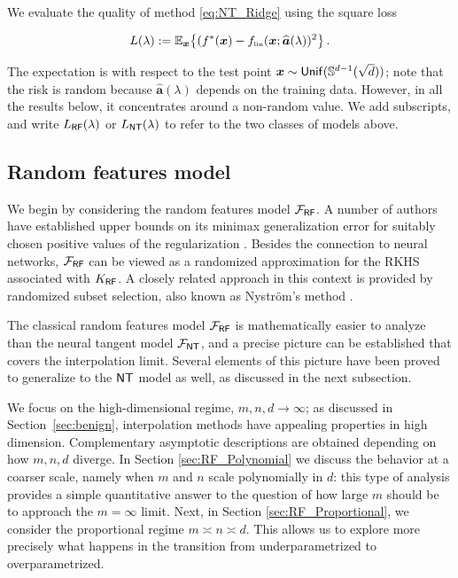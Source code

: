 We evaluate the quality of method \eqref{eq:NT_Ridge} using the square loss

\begin{align}
  {L}(\lambda):= \mathbb{E}_{{\boldsymbol x}}\big\{(f^*({\boldsymbol x})-f_{\mbox{\rm\tiny lin}}({\boldsymbol x};{\widehat {\boldsymbol a}}(\lambda))^2\big\}\, .
\end{align}

The expectation is with respect to the test point ${\boldsymbol x}\sim {\sf Unif}({\mathbb S}^{d-1}(\sqrt{d}))$;
note that the risk is random because ${\widehat {\boldsymbol a}}(\lambda)$ depends on the training data. However, in all the results below, it concentrates around a non-random value. We add subscripts, and write ${L}_{{\sf RF}}(\lambda)$ or ${L}_{{\sf NT}}(\lambda)$ to refer to the two classes of models above.

\subsection{Random features model}
\label{sec:RF}

We begin by considering the random features model ${\mathcal F}_{{\sf RF}}$. A number of authors have established upper bounds on its minimax generalization error for suitably chosen positive values of the regularization \cite{rudi2017generalization,rahimi2009weighted}. Besides the connection to neural networks,  ${\mathcal F}_{{\sf RF}}$  can be viewed as a randomized approximation  for the RKHS associated with $K_{{\sf RF}}$. A closely related approach in this context is provided by randomized subset selection, also known as Nystr\"om's method \cite{williams2001using,bach2013sharp,alaoui2015fast,rudi2015less}.

The classical random features model ${\mathcal F}_{{\sf RF}}$ is mathematically easier to analyze than the neural tangent model
 ${\mathcal F}_{{\sf NT}}$,   and a precise picture can be established that covers the interpolation limit. Several elements of this picture have been proved to generalize to the ${\sf NT}$ model as well, as discussed in the next subsection.

We focus on the high-dimensional regime, $m,n,d\to\infty$; as discussed in Section~\ref{sec:benign}, interpolation methods have appealing properties in high dimension. Complementary asymptotic descriptions are obtained depending on how $m,n,d$ diverge. In Section \ref{sec:RF_Polynomial} we discuss the behavior at a coarser scale, namely when $m$ and $n$ scale polynomially in $d$: this type of analysis provides a simple quantitative answer to the question of how large $m$ should be to approach the $m=\infty$ limit. Next, in Section \ref{sec:RF_Proportional}, we consider the proportional regime $m\asymp n\asymp d$. This allows us to explore more precisely what happens in the transition from underparametrized to overparametrized.

